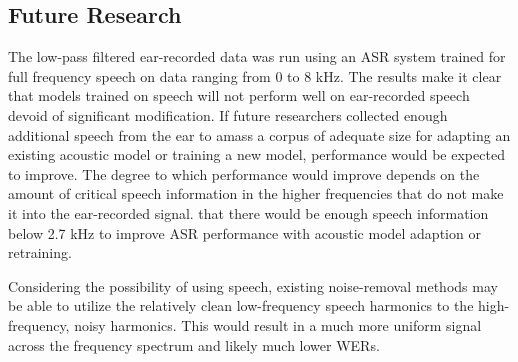 
\subsection{Future Research}
\label{chap4:future-research}
\DIFaddend 

The low-pass filtered ear-recorded data was run using an ASR system trained for full frequency speech on data ranging from 0 to 8 kHz.  The results make it clear that models trained on \DIFdelbegin {}\DIFdelend \DIFaddbegin {}\DIFaddend speech will not perform well on ear-recorded speech devoid of significant modification.  If future researchers collected enough additional speech from the ear to amass a corpus of adequate size for adapting an existing acoustic model or training a new model, performance would be expected to improve.  The degree to which performance would improve depends on the amount of critical speech information in the higher frequencies that do not make it into the ear-recorded signal.  \DIFdelbegin {}\DIFdelend \DIFaddbegin {}\DIFaddend that there would be enough speech information below 2.7 kHz to \DIFdelbegin {}\DIFdelend improve ASR performance with acoustic model adaption or retraining.

Considering the possibility of using \DIFdelbegin {}\DIFdelend \DIFaddbegin {}\DIFaddend speech, existing noise-removal methods may be able to utilize the relatively clean low-frequency speech harmonics to \DIFdelbegin {}\DIFdelend \DIFaddbegin {}\DIFaddend the high-frequency, noisy harmonics.  This would result in a much more uniform signal across the frequency spectrum and likely much lower WERs.

